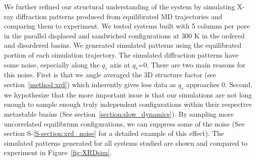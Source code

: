 \documentclass[journal=jpcbfk,manuscript=article]{achemso}
\begin{document}
  We further refined our structural understanding of the system by simulating X-ray 
  diffraction patterns produced from equilibrated MD trajectories and comparing them
  to experiment. We tested systems built with 5 columns per pore in the parallel 
  displaced and sandwiched configurations at 300 K in the ordered and disordered
  basins. We generated simulated patterns using the equilibrated portion of each 
  simulation trajectory. The simulated diffraction patterns have some noise, especially
  along the $q_z$ axis at $q_r$=0. There are two main reasons for this noise. First
  is that we angle averaged the 3D structure factor (see section~\ref{method:xrd})
  which inherently gives less data as $q_r$ approaches 0. Second, we hypothesize that 
  the more important issue is that our simulations are not long enough to sample 
  enough truly independent configurations within their respective metastable basins
  (See section~\ref{section:slow_dynamics}). By sampling more uncorrelated equilibrium
  configurations, we can suppress some of the noise (See section S-\ref{S-section:xrd_noise}
  for a detailed example of this effect). The simulated patterns generated for all systems
  studied are shown and compared to experiment in Figure~\ref{fig:XRDsim}.
\end{document}
